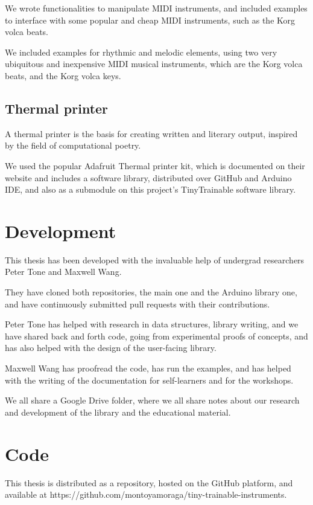 We wrote functionalities to manipulate MIDI instruments, and included examples to interface with some popular and cheap MIDI instruments, such as the Korg volca beats.

We included examples for rhythmic and melodic elements, using two very ubiquitous and inexpensive MIDI musical instruments, which are the Korg volca beats, and the Korg volca keys.

\subsection{Thermal printer}

A thermal printer is the basis for creating written and literary output, inspired by the field of computational poetry.

We used the popular Adafruit Thermal printer kit, which is documented on their website and includes a software library, distributed over GitHub and Arduino IDE, and also as a submodule on this project's TinyTrainable software library.

\section{Development}

This thesis has been developed with the invaluable help of undergrad researchers Peter Tone and Maxwell Wang.

They have cloned both repositories, the main one and the Arduino library one, and have continuously submitted pull requests with their contributions.

Peter Tone has helped with research in data structures, library writing, and we have shared back and forth code, going from experimental proofs of concepts, and has also helped with the design of the user-facing library.

Maxwell Wang has proofread the code, has run the examples, and has helped with the writing of the documentation for self-learners and for the workshops.

We all share a Google Drive folder, where we all share notes about our research and development of the library and the educational material.

\section{Code}

This thesis is distributed as a repository, hosted on the GitHub platform, and available at https://github.com/montoyamoraga/tiny-trainable-instruments.

